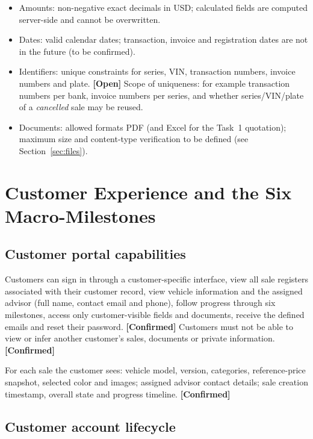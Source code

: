 \documentclass[11pt,a4paper]{article}
\newcommand{\tagconf}{\textcolor{green!45!black}{\textbf{[Confirmed]}}}
\newcommand{\tagopen}{\textcolor{red!70!black}{\textbf{[Open]}}}
\begin{document}
\begin{itemize}
	\item Amounts: non-negative exact decimals in USD; calculated fields are
	      computed server-side and cannot be overwritten.
	\item Dates: valid calendar dates; transaction, invoice and registration dates
	      are not in the future (to be confirmed).
	\item Identifiers: unique constraints for series, VIN, transaction numbers,
	      invoice numbers and plate. \tagopen{} Scope of uniqueness: for example
	      transaction numbers per bank, invoice numbers per series, and whether
	      series/VIN/plate of a \emph{cancelled} sale may be reused.
	\item Documents: allowed formats PDF (and Excel for the Task~1 quotation);
	      maximum size and content-type verification to be defined (see
	      Section~\ref{sec:files}).
\end{itemize}

\section{Customer Experience and the Six Macro-Milestones}

\subsection{Customer portal capabilities}

Customers can sign in through a customer-specific interface, view all sale
registers associated with their customer record, view vehicle information and
the assigned advisor (full name, contact email and phone), follow progress
through six milestones, access only customer-visible fields and documents,
receive the defined emails and reset their password. \tagconf{} Customers must
not be able to view or infer another customer's sales, documents or private
information. \tagconf{}

For each sale the customer sees: vehicle model, version, categories,
reference-price snapshot, selected color and images; assigned advisor contact
details; sale creation timestamp, overall state and progress timeline.
\tagconf{}

\subsection{Customer account lifecycle}
\end{document}
